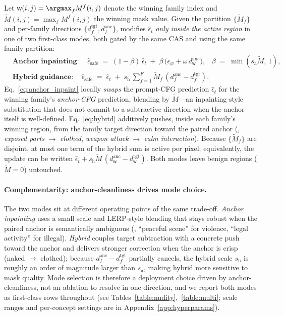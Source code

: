 Let $\mathsf{w}(i,j) = \argmax_{f} M^{f}(i,j)$ denote the winning family index and $\widetilde{M}(i,j) = \max_{f} M^{f}(i,j)$ the winning mask value. Given the partition $\{\widetilde{M}_f\}$ and per-family directions $\{d^{\text{tgt}}_f, d^{\text{anc}}_f\}$, \ours{} modifies $\hat{\epsilon}_t$ \emph{only inside the active region} in one of two first-class modes, both gated by the same CAS and using the same family partition:
\begin{align}
    &\textbf{Anchor inpainting}:\quad
    \hat{\epsilon}_{\text{safe}} \;=\; (1-\beta)\,\hat{\epsilon}_t \;+\; \beta\,\big(\epsilon_\varnothing + \omega\,d^{\text{anc}}_{\mathsf{w}}\big),
    \;\;\; \beta \;=\; \min(s_{\text{a}}\widetilde{M},\,1),
    \label{eq:anchor_inpaint}\\[2pt]
    &\textbf{Hybrid guidance}:\quad
    \hat{\epsilon}_{\text{safe}} \;=\; \hat{\epsilon}_t \;+\; s_{\text{h}}\,\textstyle\sum_{f=1}^{F} \widetilde{M}_f\,(d^{\text{anc}}_f - d^{\text{tgt}}_f).
    \label{eq:hybrid}
\end{align}
Eq.~\ref{eq:anchor_inpaint} locally \emph{swaps} the prompt-CFG prediction $\hat{\epsilon}_t$ for the winning family's \emph{anchor-CFG} prediction, blending by $\widetilde{M}$---an inpainting-style substitution that does not commit to a subtractive direction when the anchor itself is well-defined. Eq.~\ref{eq:hybrid} additively pushes, inside each family's winning region, from the family target direction toward the paired anchor (\eg, \textit{exposed parts} $\to$ \textit{clothed}, \textit{weapon attack} $\to$ \textit{calm interaction}). Because $\{\widetilde{M}_f\}$ are disjoint, at most one term of the hybrid sum is active per pixel; equivalently, the update can be written $\hat{\epsilon}_t + s_{\text{h}}\widetilde{M}\,(d^{\text{anc}}_{\mathsf{w}} - d^{\text{tgt}}_{\mathsf{w}})$. Both modes leave benign regions ($\widetilde{M}{=}0$) untouched.

\paragraph{Complementarity: anchor-cleanliness drives mode choice.}
The two modes sit at different operating points of the same trade-off. \emph{Anchor inpainting} uses a small scale and LERP-style blending that stays robust when the paired anchor is semantically ambiguous (\eg, ``peaceful scene'' for violence, ``legal activity'' for illegal). \emph{Hybrid} couples target subtraction with a concrete push toward the anchor and delivers stronger correction when the anchor is crisp (naked $\to$ clothed); because $d^{\text{anc}}_f - d^{\text{tgt}}_f$ partially cancels, the hybrid scale $s_{\text{h}}$ is roughly an order of magnitude larger than $s_{\text{a}}$, making hybrid more sensitive to mask quality. Mode selection is therefore a deployment choice driven by anchor-cleanliness, not an ablation to resolve in one direction, and we report both modes as first-class rows throughout (see Tables~\ref{table:nudity},~\ref{table:multi}; scale ranges and per-concept settings are in Appendix~\ref{app:hyperparams}).

